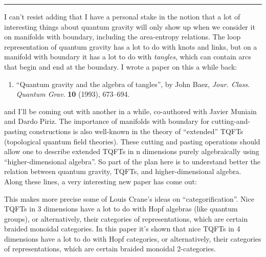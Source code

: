 \documentclass{article}
\def\tightlist{}
\renewcommand{\texttt}[1]{%
  \begingroup
  \ttfamily
  \begingroup\lccode`~=`/\lowercase{\endgroup\def~}{/\discretionary{}{}{}}%
  \begingroup\lccode`~=`[\lowercase{\endgroup\def~}{[\discretionary{}{}{}}%
  \begingroup\lccode`~=`.\lowercase{\endgroup\def~}{.\discretionary{}{}{}}%
  \catcode`/=\active\catcode`[=\active\catcode`.=\active
  \scantokens{#1\noexpand}%
  \endgroup
}
\begin{document}
\begin{center}\rule{0.5\linewidth}{0.5pt}\end{center}

I can't resist adding that I have a personal stake in the notion that a
lot of interesting things about quantum gravity will only show up when
we consider it on manifolds with boundary, including the area-entropy
relations. The loop representation of quantum gravity has a lot to do
with knots and links, but on a manifold with boundary it has a lot to do
with \emph{tangles}, which can contain arcs that begin and end at the
boundary. I wrote a paper on this a while back:

\begin{enumerate}
\def\labelenumi{\arabic{enumi})}
\setcounter{enumi}{6}
\tightlist
\item
  ``Quantum gravity and the algebra of tangles'', by John Baez,
  \emph{Jour. Class. Quantum Grav.} \textbf{10} (1993), 673--694.
\end{enumerate}

and I'll be coming out with another in a while, co-authored with Javier
Muniain and Dardo Piriz. The importance of manifolds with boundary for
cutting-and-pasting constructions is also well-known in the theory of
``extended'' TQFTs (topological quantum field theories). These cutting
and pasting operations should allow one to describe extended TQFTs in n
dimensions purely algebraically using ``higher-dimensional algebra''. So
part of the plan here is to understand better the relation between
quantum gravity, TQFTs, and higher-dimensional algebra. Along these
lines, a very interesting new paper has come out:


This makes more precise some of Louis Crane's ideas on
``categorification''. Nice TQFTs in 3 dimensions have a lot to do with
Hopf algebras (like quantum groups), or alternatively, their categories
of representations, which are certain braided monoidal categories. In
this paper it's shown that nice TQFTs in 4 dimensions have a lot to do
with Hopf categories, or alternatively, their categories of
representations, which are certain braided monoidal 2-categories.
\end{document}
